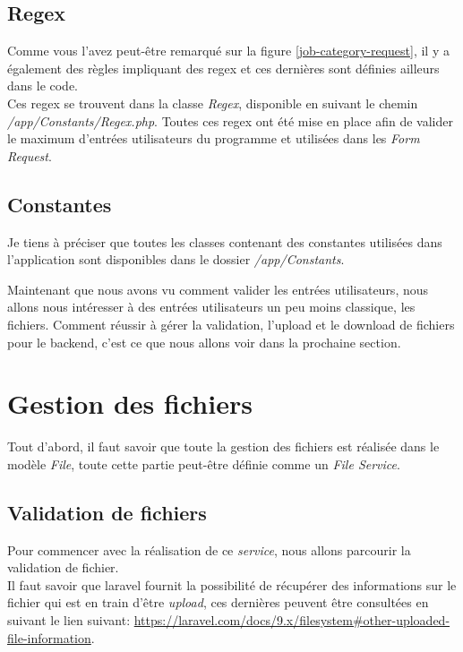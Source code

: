 \documentclass[
    iai, %
    il, %
]{heig-tb}
\begin{document}
\subsection{Regex}
Comme vous l'avez peut-être remarqué sur la figure \ref{job-category-request}, il y a également des règles impliquant des \Gls{regex} et ces dernières sont définies ailleurs dans le code. \\
Ces \Gls{regex} se trouvent dans la classe \emph{Regex}, disponible en suivant le chemin \emph{/app/Constants/Regex.php}. Toutes ces \Gls{regex} ont été mise en place afin de valider le maximum d'entrées utilisateurs du programme et utilisées dans les \emph{Form Request}.

\subsection{Constantes}
Je tiens à préciser que toutes les classes contenant des constantes utilisées dans l'application sont disponibles dans le dossier \emph{/app/Constants}.

Maintenant que nous avons vu comment valider les entrées utilisateurs, nous allons nous intéresser à des entrées utilisateurs un peu moins classique, les fichiers. Comment réussir à gérer la validation, l'upload et le download de fichiers pour le \Gls{backend}, c'est ce que nous allons voir dans la prochaine section.

\section{Gestion des fichiers}
Tout d'abord, il faut savoir que toute la gestion des fichiers est réalisée dans le modèle \emph{File}, toute cette partie peut-être définie comme un \emph{File Service}.

\subsection{Validation de fichiers}

Pour commencer avec la réalisation de ce \emph{service}, nous allons parcourir la validation de fichier. \\
Il faut savoir que \Gls{laravel} fournit la possibilité de récupérer des informations sur le fichier qui est en train d'être \emph{upload}, ces dernières peuvent être consultées en suivant le lien suivant: \href{https://laravel.com/docs/9.x/filesystem#other-uploaded-file-information}{https://laravel.com/docs/9.x/filesystem#other-uploaded-file-information}. \\
\end{document}
